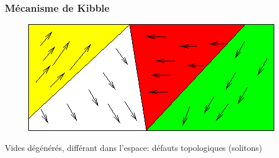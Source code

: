 \documentclass[handout]{beamer}
\begin{document}
\begin{frame}\frametitle{Mécanisme de Kibble}


    \begin{figure}[0.3\textwidth]
    \includegraphics[scale=0.4]{murs.png}
    \end{figure}
Vides dégénérés, différant dans l'espace: défauts topologiques (solitons)


\end{frame}

%
\end{document}

